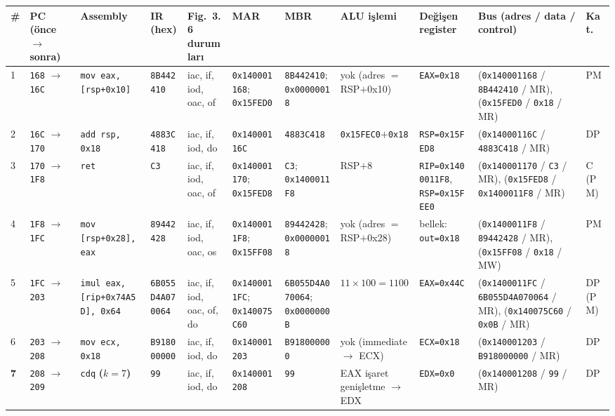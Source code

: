 \documentclass[11pt,a4paper]{article}
\newcommand{\tl}{\texttt}
\newcommand{\hd}[1]{\cellcolor{hdr}#1}
\renewcommand{\arraystretch}{1.35}
\begin{document}
\begin{landscape}
{\scriptsize
\setlength{\tabcolsep}{2.5pt}
\renewcommand{\arraystretch}{1.25}
\begin{longtable}{|p{0.35cm}|p{1.95cm}|p{3.0cm}|p{1.85cm}|p{1.6cm}|p{1.9cm}|p{2.1cm}|p{2.3cm}|p{2.0cm}|p{4.2cm}|p{0.9cm}|}
\hline
\hd{\#} & \hd{PC (önce $\to$ sonra)} & \hd{Assembly} & \hd{IR (hex)} & \hd{Fig.~3.6 durumları} & \hd{MAR} & \hd{MBR} & \hd{ALU işlemi} & \hd{Değişen register} & \hd{Bus (adres / data / control)} & \hd{Kat.}\\
\hline
\endhead
1 & \tl{168} $\to$ \tl{16C} & \tl{mov eax, [rsp+0x10]} & \tl{8B442410} & iac, if, iod, oac, of & \tl{0x140001168}; \tl{0x15FED0} & \tl{8B442410}; \tl{0x00000018} & yok (adres $=$ RSP$+$0x10) & \tl{EAX=0x18} & (\tl{0x140001168} / \tl{8B442410} / MR), (\tl{0x15FED0} / \tl{0x18} / MR) & PM\\
\hline
2 & \tl{16C} $\to$ \tl{170} & \tl{add rsp, 0x18} & \tl{4883C418} & iac, if, iod, do & \tl{0x14000116C} & \tl{4883C418} & \tl{0x15FEC0}$+$\tl{0x18} & \tl{RSP=0x15FED8} & (\tl{0x14000116C} / \tl{4883C418} / MR) & DP\\
\hline
3 & \tl{170} $\to$ \tl{1F8} & \tl{ret} & \tl{C3} & iac, if, iod, oac, of & \tl{0x140001170}; \tl{0x15FED8} & \tl{C3}; \tl{0x1400011F8} & RSP$+$8 & \tl{RIP=0x1400011F8}, \tl{RSP=0x15FEE0} & (\tl{0x140001170} / \tl{C3} / MR), (\tl{0x15FED8} / \tl{0x1400011F8} / MR) & C (PM)\\
\hline
4 & \tl{1F8} $\to$ \tl{1FC} & \tl{mov [rsp+0x28], eax} & \tl{89442428} & iac, if, iod, oac, os & \tl{0x1400011F8}; \tl{0x15FF08} & \tl{89442428}; \tl{0x00000018} & yok (adres $=$ RSP$+$0x28) & bellek: \tl{out=0x18} & (\tl{0x1400011F8} / \tl{89442428} / MR), (\tl{0x15FF08} / \tl{0x18} / MW) & PM\\
\hline
5 & \tl{1FC} $\to$ \tl{203} & \tl{imul eax, [rip+0x74A5D], 0x64} & \tl{6B055D4A070064} & iac, if, iod, oac, of, do & \tl{0x1400011FC}; \tl{0x140075C60} & \tl{6B055D4A070064}; \tl{0x0000000B} & $11 \times 100 = 1100$ & \tl{EAX=0x44C} & (\tl{0x1400011FC} / \tl{6B055D4A070064} / MR), (\tl{0x140075C60} / \tl{0x0B} / MR) & DP (PM)\\
\hline
6 & \tl{203} $\to$ \tl{208} & \tl{mov ecx, 0x18} & \tl{B918000000} & iac, if, iod, do & \tl{0x140001203} & \tl{B918000000} & yok (immediate $\to$ ECX) & \tl{ECX=0x18} & (\tl{0x140001203} / \tl{B918000000} / MR) & DP\\
\hline
\textbf{7} & \tl{208} $\to$ \tl{209} & \tl{cdq} \textbf{($k=7$)} & \tl{99} & iac, if, iod, do & \tl{0x140001208} & \tl{99} & EAX işaret genişletme $\to$ EDX & \tl{EDX=0x0} & (\tl{0x140001208} / \tl{99} / MR) & DP\\

\end{longtable}}
\end{landscape}
\end{document}
